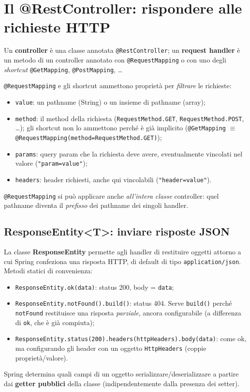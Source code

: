 \section{Il @RestController: rispondere alle richieste HTTP}

\begin{definizione}
Un \textbf{controller} \`e una classe annotata \texttt{@RestController}; un
\textbf{request handler} \`e un metodo di un controller annotato con
\texttt{@RequestMapping} o con uno degli \emph{shortcut} \texttt{@GetMapping},
\texttt{@PostMapping}, \dots
\end{definizione}

\texttt{@RequestMapping} e gli shortcut ammettono propriet\`a per \emph{filtrare} le
richieste:
\begin{itemize}
  \item \texttt{value}: un pathname (String) o un insieme di pathname (array);
  \item \texttt{method}: il method della richiesta (\texttt{RequestMethod.GET},
        \texttt{RequestMethod.POST}, \dots); gli shortcut non lo ammettono perch\'e \`e
        gi\`a implicito (\texttt{@GetMapping} $\equiv$
        \texttt{@RequestMapping(method=RequestMethod.GET)});
  \item \texttt{params}: query param che la richiesta deve avere, eventualmente vincolati nel
        valore (\texttt{"param=value"});
  \item \texttt{headers}: header richiesti, anche qui vincolabili (\texttt{"header=value"}).
\end{itemize}
\texttt{@RequestMapping} si pu\`o applicare anche \emph{all'intera classe} controller: quel
pathname diventa il \emph{prefisso} dei pathname dei singoli handler.

\subsection{ResponseEntity<T>: inviare risposte JSON}
La classe \textbf{ResponseEntity} permette agli handler di restituire oggetti attorno a cui
Spring confeziona una risposta HTTP, di default di tipo \texttt{application/json}. Metodi
statici di convenienza:
\begin{itemize}
  \item \texttt{ResponseEntity.ok(data)}: status 200, body = \texttt{data};
  \item \texttt{ResponseEntity.notFound().build()}: status 404. Serve \texttt{build()}
        perch\'e \texttt{notFound} restituisce una risposta \emph{parziale}, ancora
        configurabile (a differenza di \texttt{ok}, che \`e gi\`a compiuta);
  \item \texttt{ResponseEntity.status(200).headers(httpHeaders).body(data)}: come ok, ma
        configurando gli header con un oggetto \texttt{HttpHeaders} (coppie
        propriet\`a/valore).
\end{itemize}
\begin{attenzione}
Spring determina quali campi di un oggetto serializzare/deserializzare a partire dai
\textbf{getter pubblici} della classe (indipendentemente dalla presenza dei setter).
\end{attenzione}

